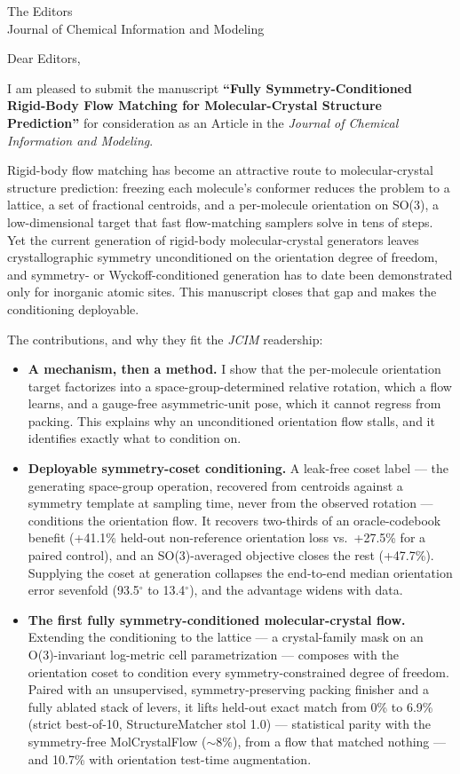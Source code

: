 \documentclass[11pt]{letter}
\begin{document}
\begin{letter}{The Editors\\Journal of Chemical Information and Modeling}
\opening{Dear Editors,}

I am pleased to submit the manuscript \textbf{``Fully Symmetry-Conditioned
Rigid-Body Flow Matching for Molecular-Crystal Structure Prediction''} for
consideration as an Article in the \textit{Journal of Chemical Information and
Modeling}.

Rigid-body flow matching has become an attractive route to molecular-crystal
structure prediction: freezing each molecule's conformer reduces the problem to a
lattice, a set of fractional centroids, and a per-molecule orientation on SO(3), a
low-dimensional target that fast flow-matching samplers solve in tens of steps.
Yet the current generation of rigid-body molecular-crystal generators leaves
crystallographic symmetry unconditioned on the orientation degree of freedom, and
symmetry- or Wyckoff-conditioned generation has to date been demonstrated only for
inorganic atomic sites. This manuscript closes that gap and makes the conditioning
deployable.

The contributions, and why they fit the \textit{JCIM} readership:

\begin{itemize}
\item \textbf{A mechanism, then a method.} I show that the per-molecule orientation
target factorizes into a space-group-determined relative rotation, which a flow
learns, and a gauge-free asymmetric-unit pose, which it cannot regress from
packing. This explains why an unconditioned orientation flow stalls, and it
identifies exactly what to condition on.

\item \textbf{Deployable symmetry-coset conditioning.} A leak-free coset label ---
the generating space-group operation, recovered from centroids against a symmetry
template at sampling time, never from the observed rotation --- conditions the
orientation flow. It recovers two-thirds of an oracle-codebook benefit
(+41.1\% held-out non-reference orientation loss vs.\ +27.5\% for a paired
control), and an SO(3)-averaged objective closes the rest (+47.7\%). Supplying the
coset at generation collapses the end-to-end median orientation error sevenfold
(93.5$^\circ$ to 13.4$^\circ$), and the advantage widens with data.

\item \textbf{The first fully symmetry-conditioned molecular-crystal flow.}
Extending the conditioning to the lattice --- a crystal-family mask on an
O(3)-invariant log-metric cell parametrization --- composes with the orientation
coset to condition every symmetry-constrained degree of freedom. Paired with an
unsupervised, symmetry-preserving packing finisher and a fully ablated stack of
levers, it lifts held-out exact match from 0\% to 6.9\% (strict best-of-10,
StructureMatcher stol 1.0) --- statistical parity with the symmetry-free
MolCrystalFlow (${\sim}8\%$), from a flow that matched nothing --- and 10.7\% with
orientation test-time augmentation.


\end{itemize}
\end{letter}
\end{document}
